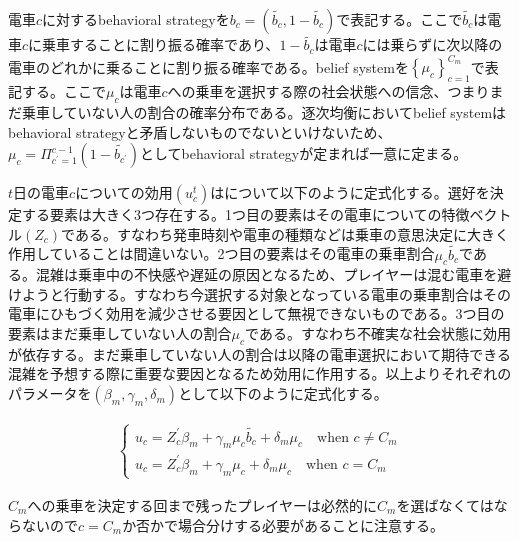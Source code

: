 \documentclass{jsarticle}
\begin{document}
電車$c$に対するbehavioral strategyを$b_c = (\tilde{b_c}, 1 - \tilde{b_c})$で表記する。ここで$\tilde{b_c}$は電車$c$に乗車することに割り振る確率であり、$1 - \tilde{b_c}$は電車$c$には乗らずに次以降の電車のどれかに乗ることに割り振る確率である。belief systemを$\left\{ \mu_c \right\}_{c = 1}^{C_m}$で表記する。ここで$\mu_c$は電車$c$への乗車を選択する際の社会状態への信念、つまりまだ乗車していない人の割合の確率分布である。逐次均衡においてbelief systemはbehavioral strategyと矛盾しないものでないといけないため、$\mu_c = \Pi_{c^{'} = 1}^{c-1} (1 - \tilde{b_{c^{'}}})$としてbehavioral strategyが定まれば一意に定まる。

$t$日の電車$c$についての効用$(u_c^t)$はについて以下のように定式化する。選好を決定する要素は大きく3つ存在する。1つ目の要素はその電車についての特徴ベクトル$(Z_c)$である。すなわち発車時刻や電車の種類などは乗車の意思決定に大きく作用していることは間違いない。2つ目の要素はその電車の乗車割合$\mu_c \tilde{b_c}$である。混雑は乗車中の不快感や遅延の原因となるため、プレイヤーは混む電車を避けようと行動する。すなわち今選択する対象となっている電車の乗車割合はその電車にひもづく効用を減少させる要因として無視できないものである。3つ目の要素はまだ乗車していない人の割合$\mu_c$である。すなわち不確実な社会状態に効用が依存する。まだ乗車していない人の割合は以降の電車選択において期待できる混雑を予想する際に重要な要因となるため効用に作用する。以上よりそれぞれのパラメータを$(\beta_m, \gamma_m, \delta_m)$として以下のように定式化する。

\begin{align*}
	\begin{cases}
	u_c = Z_c^{'} \beta_m + \gamma_m \mu_{c} \tilde{b_c} + \delta_m \mu_c\quad \text{when $c \neq C_m$}\\[8pt]
	u_{c} = Z_c^{'} \beta_m + \gamma_m \mu_{c} + \delta_m \mu_c\quad \text{when $c = C_m$}
	\end{cases}
\end{align*}

$C_m$への乗車を決定する回まで残ったプレイヤーは必然的に$C_m$を選ばなくてはならないので$c = C_m$か否かで場合分けする必要があることに注意する。
\end{document}
